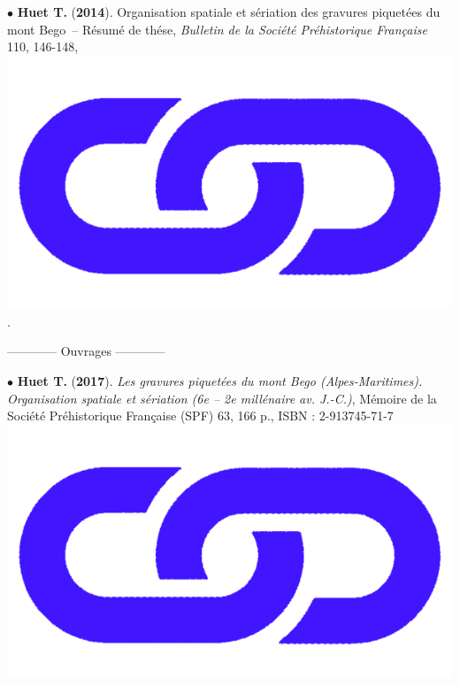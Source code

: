 \documentclass{article}
\begin{document}
\smallbreak
$\bullet$ \textbf{Huet T.} (\textbf{2014}). Organisation spatiale et s\'{e}riation des gravures piquet\'{e}es du mont Bego~-- R\'{e}sum\'{e} de th\'{e}se, \textit{Bulletin de la Soci\'{e}t\'{e} Pr\'{e}historique Fran\c{c}aise} 110, 146-148, \href{https://www.persee.fr/doc/bspf_0249-7638_2013_num_110_1_14242}{\includegraphics[scale=0.02]{link_darkblue.png}}.

\begin{center}------------ Ouvrages ------------ \end{center}
\smallbreak
$\bullet$ \textbf{Huet T.} (\textbf{2017}). \textit{Les gravures piquet\'{e}es du mont Bego (Alpes-Maritimes). Organisation spatiale et s\'{e}riation (6e -- 2e mill\'{e}naire av. J.-C.)}, M\'{e}moire de la Soci\'{e}t\'{e} Pr\'{e}historique Fran\c{c}aise (SPF) 63, 166 p., ISBN : 2-913745-71-7 \href{http://www.prehistoire.org/shop_515-40342-0-0/m63-2017-les-gravures-piquetees-du-mont-bego-alpes-maritimes-organisation-spatiale-et-seriation-vie-iie-millenaire-av.-j.-c.-t.-huet.html}{\includegraphics[scale=0.02]{link_darkblue.png}}
\end{document}
